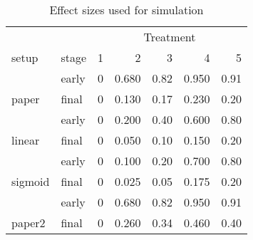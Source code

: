 \begin{table}

\caption{\label{tab:table_effect_names}Effect sizes used for simulation}
\centering
\begin{tabular}[t]{llrrrrr}
\toprule
\multicolumn{2}{c}{ } & \multicolumn{5}{c}{Treatment} \\
\cmidrule(l{3pt}r{3pt}){3-7}
setup & stage & 1 & 2 & 3 & 4 & 5\\
\midrule
 & early & 0 & 0.680 & 0.82 & 0.950 & 0.91\\

\multirow{-2}{*}{\raggedright\arraybackslash paper} & final & 0 & 0.130 & 0.17 & 0.230 & 0.20\\
\cmidrule{1-7}
 & early & 0 & 0.200 & 0.40 & 0.600 & 0.80\\

\multirow{-2}{*}{\raggedright\arraybackslash linear} & final & 0 & 0.050 & 0.10 & 0.150 & 0.20\\
\cmidrule{1-7}
 & early & 0 & 0.100 & 0.20 & 0.700 & 0.80\\

\multirow{-2}{*}{\raggedright\arraybackslash sigmoid} & final & 0 & 0.025 & 0.05 & 0.175 & 0.20\\
\cmidrule{1-7}
 & early & 0 & 0.680 & 0.82 & 0.950 & 0.91\\

\multirow{-2}{*}{\raggedright\arraybackslash paper2} & final & 0 & 0.260 & 0.34 & 0.460 & 0.40\\
\bottomrule
\end{tabular}
\end{table}
